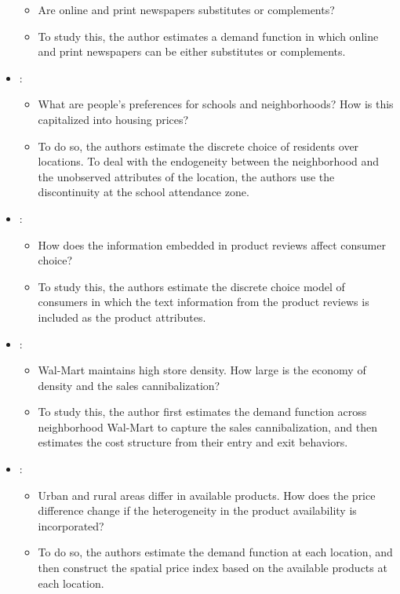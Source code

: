 \documentclass[
]{book}
\providecommand{\tightlist}{%
  \setlength{\itemsep}{0pt}\setlength{\parskip}{0pt}}
\begin{document}
\begin{itemize}
  \begin{itemize}
  \tightlist
  \item
    Are online and print newspapers substitutes or complements?
  \item
    To study this, the author estimates a demand function in which online and print newspapers can be either substitutes or complements.
  \end{itemize}
\item
  \citet{Bayer2007}:

  \begin{itemize}
  \tightlist
  \item
    What are people's preferences for schools and neighborhoods? How is this capitalized into housing prices?
  \item
    To do so, the authors estimate the discrete choice of residents over locations. To deal with the endogeneity between the neighborhood and the unobserved attributes of the location, the authors use the discontinuity at the school attendance zone.
  \end{itemize}
\item
  \citet{Archak2011}:

  \begin{itemize}
  \tightlist
  \item
    How does the information embedded in product reviews affect consumer choice?
  \item
    To study this, the authors estimate the discrete choice model of consumers in which the text information from the product reviews is included as the product attributes.
  \end{itemize}
\item
  \citet{Holmes2011}:

  \begin{itemize}
  \tightlist
  \item
    Wal-Mart maintains high store density. How large is the economy of density and the sales cannibalization?
  \item
    To study this, the author first estimates the demand function across neighborhood Wal-Mart to capture the sales cannibalization, and then estimates the cost structure from their entry and exit behaviors.
  \end{itemize}
\item
  \citet{Handbury2014}:

  \begin{itemize}
  \tightlist
  \item
    Urban and rural areas differ in available products. How does the price difference change if the heterogeneity in the product availability is incorporated?
  \item
    To do so, the authors estimate the demand function at each location, and then construct the spatial price index based on the available products at each location.
  \end{itemize}
\end{itemize}
\end{document}
